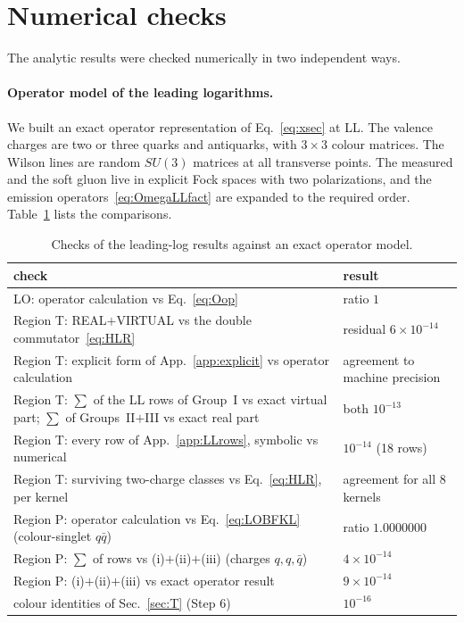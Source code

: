 \section{Numerical checks}\label{app:checks}

The analytic results were checked numerically in two independent ways.

\paragraph*{Operator model of the leading logarithms.} We built an exact operator representation of Eq.~\eqref{eq:xsec} at LL. The valence charges are two or three quarks and antiquarks, with $3\times3$ colour matrices. The Wilson lines are random $SU(3)$ matrices at all transverse points. The measured and the soft gluon live in explicit Fock spaces with two polarizations, and the emission operators~\eqref{eq:OmegaLLfact} are expanded to the required order. Table~\ref{tab:checksLL} lists the comparisons.

\begin{table}[!htbp]
\centering
\small
\renewcommand{\arraystretch}{1.2}
\begin{tabular}{p{9.6cm}p{5.4cm}}
\toprule
check & result\\
\midrule
LO: operator calculation vs Eq.~\eqref{eq:Oop} & ratio $1$\\
Region T: REAL$+$VIRTUAL vs the double commutator~\eqref{eq:HLR} & residual $6\times10^{-14}$\\
Region T: explicit form of App.~\ref{app:explicit} vs operator calculation & agreement to machine precision\\
Region T: $\sum$ of the LL rows of Group~I vs exact virtual part; $\sum$ of Groups~II$+$III vs exact real part & both $10^{-13}$\\
Region T: every row of App.~\ref{app:LLrows}, symbolic vs numerical & $10^{-14}$ (18 rows)\\
Region T: surviving two-charge classes vs Eq.~\eqref{eq:HLR}, per kernel & agreement for all 8 kernels\\
Region P: operator calculation vs Eq.~\eqref{eq:LOBFKL} (colour-singlet $q\bar q$) & ratio $1.0000000$\\
Region P: $\sum$ of rows vs (i)$+$(ii)$+$(iii) (charges $q,q,\bar q$) & $4\times10^{-14}$\\
Region P: (i)$+$(ii)$+$(iii) vs exact operator result & $9\times10^{-14}$\\
colour identities of Sec.~\ref{sec:T} (Step 6) & $10^{-16}$\\
\bottomrule
\end{tabular}
\caption{Checks of the leading-log results against an exact operator model.}
\label{tab:checksLL}
\end{table}

